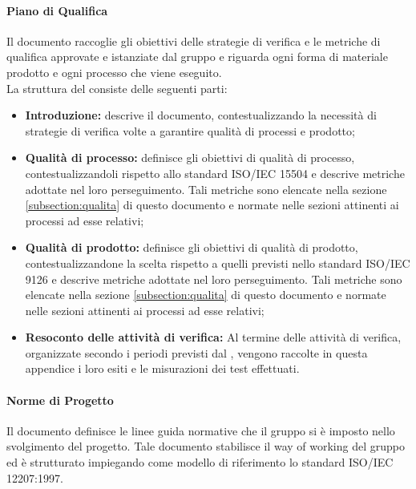 \paragraph{Piano di Qualifica}
Il documento \docNameVersionPdQ{} raccoglie gli obiettivi delle strategie di verifica e le metriche di qualifica approvate e istanziate dal gruppo e riguarda ogni forma di materiale prodotto e ogni processo che viene eseguito. \\La struttura del \docNameVersionPdQ{} consiste delle seguenti parti:
\begin{itemize}
	\item \textbf{Introduzione:} descrive il documento, contestualizzando la necessità di strategie di verifica volte a garantire qualità di processi e prodotto;
	\item \textbf{Qualità di processo:} definisce gli obiettivi di qualità di processo, contestualizzandoli rispetto allo standard ISO/IEC 15504 e descrive metriche adottate nel loro perseguimento. Tali metriche sono elencate nella sezione \ref{subsection:qualita}  di questo documento e normate nelle sezioni attinenti ai processi ad esse relativi;
	\item \textbf{Qualità di prodotto:} definisce gli obiettivi di qualità di prodotto, contestualizzandone la scelta rispetto a quelli previsti nello standard ISO/IEC 9126 e descrive metriche adottate nel loro perseguimento. Tali metriche sono elencate nella sezione \ref{subsection:qualita}  di questo documento e normate nelle sezioni attinenti ai processi ad esse relativi;
	\item \textbf{Resoconto delle attività di verifica:} Al termine delle attività di verifica, organizzate secondo i periodi previsti dal \docNameVersionPdP{}, vengono raccolte in questa appendice i loro esiti e le misurazioni dei test effettuati.
\end{itemize}
\paragraph{Norme di Progetto}
Il documento \docNameVersionNdP{} definisce le linee guida normative che il gruppo si è imposto nello svolgimento del progetto. Tale documento stabilisce il way of working del gruppo ed è strutturato impiegando come modello di riferimento lo standard ISO/IEC 12207:1997.
